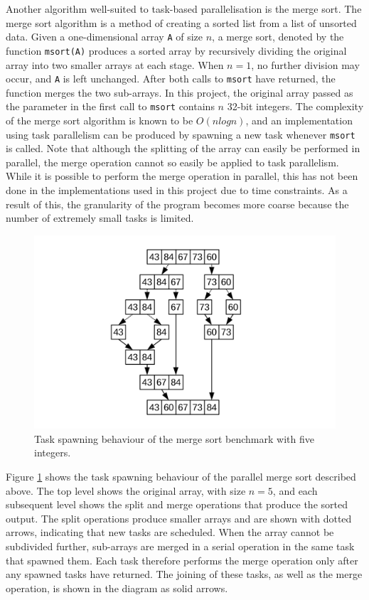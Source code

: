 \documentclass{report}
\begin{document}
Another algorithm well-suited to task-based parallelisation is the merge sort. The merge sort algorithm is a method of creating a sorted list from a list of unsorted data. Given a one-dimensional array \verb!A! of size \(n\), a merge sort, denoted by the function \verb!msort(A)! produces a sorted array by recursively dividing the original array into two smaller arrays at each stage. When \(n=1\), no further division may occur, and \verb!A! is left unchanged. After both calls to \verb!msort! have returned, the function merges the two sub-arrays. In this project, the original array passed as the parameter in the first call to \verb!msort! contains \(n\) 32-bit integers. The complexity of the merge sort algorithm is known to be \(O(n log n)\), and an implementation using task parallelism can be produced by spawning a new task whenever \verb!msort! is called. Note that although the splitting of the array can easily be performed in parallel, the merge operation cannot so easily be applied to task parallelism. While it is possible to perform the merge operation in parallel, this has not been done in the implementations used in this project due to time constraints. As a result of this, the granularity of the program becomes more coarse because the number of extremely small tasks is limited.
\noindent
\begin{figure}
	\includegraphics[width=\linewidth]{../diagrams/msort_tasks}
	\caption{Task spawning behaviour of the merge sort benchmark with five integers.}
	\label{Fig:msorttasks}
\end{figure}

Figure \ref{Fig:msorttasks} shows the task spawning behaviour of the parallel merge sort described above. The top level shows the original array, with size \(n=5\), and each subsequent level shows the split and merge operations that produce the sorted output. The split operations produce smaller arrays and are shown with dotted arrows, indicating that new tasks are scheduled. When the array cannot be subdivided further, sub-arrays are merged in a serial operation in the same task that spawned them. Each task therefore performs the merge operation only after any spawned tasks have returned. The joining of these tasks, as well as the merge operation, is shown in the diagram as solid arrows.
\end{document}
